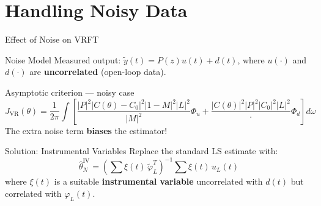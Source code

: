 \documentclass[hyperref={pdfpagemode=FullScreen},aspectratio=169]{beamer}
\newcommand{\alerttext}[1]{{\color{alertred}\textbf{#1}}}
\begin{document}
\section{Handling Noisy Data}

\begin{frame}{Effect of Noise on VRFT}
  \begin{block}{Noise Model}
    Measured output: $\tilde{y}(t) = P(z)u(t) + d(t)$, where $u(\cdot)$ and $d(\cdot)$ are \textbf{uncorrelated} (open-loop data).
  \end{block}
   \vspace{-0.5em}
  \begin{block}{Asymptotic criterion — noisy case}
       \small
        \[
          J_{\mathrm{VR}}(\theta) = \frac{1}{2\pi}\!\int \!\left[\frac{|P|^2|C(\theta)-C_0|^2|1-M|^2|L|^2}{|M|^2}\Phi_u + \frac{|C(\theta)|^2|P|^2|C_0|^2|L|^2}{\cdot}\Phi_d\right]d\omega
        \]
       The extra noise term \alerttext{biases} the estimator!
    \end{block}
    \vspace{-0.5em}
     \begin{alertblock}{Solution: Instrumental Variables}
       Replace the standard LS estimate with:
        \[
          \hat{\theta}^{\mathrm{IV}}_N = \left(\sum \xi(t)\,\tilde{\varphi}_L^T\right)^{-1}\sum \xi(t)\,u_L(t)
        \]
        where $\xi(t)$ is a suitable \textbf{instrumental variable} uncorrelated with $d(t)$ but correlated with $\varphi_L(t)$.
      \end{alertblock}
\end{frame}
\end{document}
